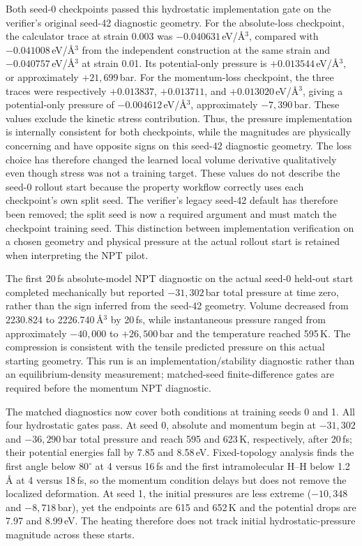 \documentclass[11pt]{article}
\begin{document}
Both seed-0 checkpoints passed this hydrostatic implementation gate on the
verifier's original seed-42 diagnostic geometry. For the absolute-loss
checkpoint, the calculator trace at strain 0.003 was
$-0.040631$\,eV/\AA$^3$, compared with $-0.041008$\,eV/\AA$^3$ from the
independent construction at the same strain and $-0.040757$\,eV/\AA$^3$ at
strain 0.01. Its potential-only pressure is $+0.013544$\,eV/\AA$^3$, or
approximately $+21{,}699$\,bar. For the momentum-loss checkpoint, the three
traces were respectively $+0.013837$, $+0.013711$, and
$+0.013020$\,eV/\AA$^3$, giving a potential-only pressure of
$-0.004612$\,eV/\AA$^3$, approximately $-7{,}390$\,bar. These values exclude
the kinetic stress contribution. Thus, the pressure implementation is
internally consistent for both checkpoints, while the magnitudes are
physically concerning and have opposite signs on this seed-42 diagnostic
geometry. The loss choice has therefore changed the learned local volume
derivative qualitatively even though stress was not a training target.
These values do not describe the seed-0 rollout start because the property
workflow correctly uses each checkpoint's own split seed. The verifier's
legacy seed-42 default has therefore been removed; the split seed is now a
required argument and must match the checkpoint training seed. This
distinction between implementation verification on a chosen geometry and
physical pressure at the actual rollout start is retained when interpreting
the NPT pilot.

The first 20\,fs absolute-model NPT diagnostic on the actual seed-0 held-out
start completed mechanically but reported $-31{,}302$\,bar total pressure at
time zero, rather than the sign inferred from the seed-42 geometry. Volume
decreased from 2230.824 to 2226.740\,\AA$^3$ by 20\,fs, while instantaneous
pressure ranged from approximately $-40{,}000$ to $+26{,}500$\,bar and the
temperature reached 595\,K. The compression is consistent with the tensile
predicted pressure on this actual starting geometry. This run is an
implementation/stability diagnostic rather than an equilibrium-density
measurement; matched-seed finite-difference gates are required before the
momentum NPT diagnostic.

The matched diagnostics now cover both conditions at training seeds 0 and 1.
All four hydrostatic gates pass. At seed 0, absolute and momentum begin at
$-31{,}302$ and $-36{,}290$\,bar total pressure and reach 595 and 623\,K,
respectively, after 20\,fs; their potential energies fall by 7.85 and
8.58\,eV. Fixed-topology analysis finds the first angle below $80^\circ$ at
4 versus 16\,fs and the first intramolecular H--H below 1.2\,\AA{} at 4
versus 18\,fs, so the momentum condition delays but does not remove the
localized deformation. At seed 1, the initial pressures are less extreme
($-10{,}348$ and $-8{,}718$\,bar), yet the endpoints are 615 and 652\,K and
the potential drops are 7.97 and 8.99\,eV. The heating therefore does not
track initial hydrostatic-pressure magnitude across these starts.
\end{document}
